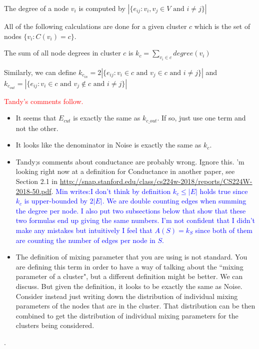 \documentclass[aps,pre,superscriptaddress]{article}
\begin{document}
The degree of a node $v_{i}$ is computed by $|\{e_{ij} :v_{i},v_{j} \in V \text{ and } i \neq j\}|$

All of the following calculations are done for a given cluster $c$ which is the set of nodes $\{v_{i} : C(v_{i}) = c\}$.

The sum of all node degrees in cluster $c$ is $k_{c} = \sum_{v_{i} \in c}{degree(v_{i})}$

Similarly, we can define $k_{c_{in}} = 2|\{e_{ij} : v_{i} \in c \text{ and } v_{j} \in c \text{ and } i \neq j\}|$ and $k_{c_{out}} = |\{e_{ij} : v_{i} \in c \text { and } v_{j} \notin c \text{ and } i \neq j\}|$






\vspace{.1in}
\textcolor{red}{Tandy's comments follow. }

\begin{itemize}

	\item It seems that $E_{cut}$ is exactly the same as $k_{c\_out}$. If so, just use one term and not the other.
	\item It looks like the denominator in Noise is exactly the same as $k_c$.
	\item Tandy;s comments about conductance are probably wrong. Ignore this.
	      'm looking right now at a definition for Conductance in another paper, see Section 2.1 in \url{http://snap.stanford.edu/class/cs224w-2018/reports/CS224W-2018-50.pdf}.    \textcolor{blue}{Min writes:I don't think by definition $k_{c} \leq |E|$ holds true since $k_{c}$ is upper-bounded by $2|E|$. We are double counting edges when summing the degree per node. I also put two subsections below that show that these two formulas end up giving the same numbers. I'm not confident that I didn't make any mistakes but intuitively I feel that $A(S)=k_{S}$ since both of them are counting the number of edges per node in $S$.}
	\item The definition of mixing parameter that you are using is not standard.  You are defining this term in order to have a way of talking about the ``mixing parameter of a cluster", but a different definition might be better. We can discuss.
	      But given the definition, it looks to be exactly the same as Noise.
	      Consider instead just writing down the distribution of individual mixing parameters of the nodes that are in the cluster.
	      That distribution can be then combined to
	      get the distribution of individual mixing
	      parameters for the clusters being considered.
\end{itemize}.
\end{document}
